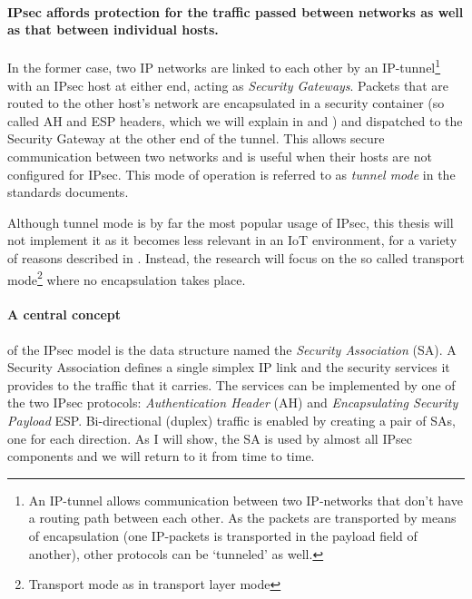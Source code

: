 \documentclass[final,a4paper,twoside,11pt,onecolumn]{report}
\begin{document}
\paragraph{IPsec affords protection for the traffic passed between networks as well as that between individual hosts.} In the former case, two IP networks are linked to each other by an IP-tunnel\footnote{An IP-tunnel allows communication between two IP-networks that don't have a routing path between each other. As the packets are transported by means of encapsulation (one IP-packets is transported in the payload field of another), other protocols can be `tunneled'  as well.} with an IPsec host at either end, acting as \emph{Security Gateways}. Packets that are routed to the other host's network are encapsulated in a security container (so called AH and ESP headers, which we will explain in  and ) and dispatched to the Security Gateway at the other end of the tunnel. This allows secure communication between two networks and is useful when their hosts are not configured for IPsec. This mode of operation is referred to as \emph{tunnel mode} in the standards documents.

Although tunnel mode is by far the most popular usage of IPsec, this thesis will not implement it as it becomes less relevant in an IoT environment, for a variety of reasons described in . Instead, the research will focus on the so called transport mode\footnote{Transport mode as in transport layer mode} where no encapsulation takes place.

\paragraph{A central concept} of the IPsec model is the data structure named the \emph{Security Association} (SA). A Security Association defines a single simplex IP link and the security services it provides to the traffic that it carries. The services can be implemented by one of the two IPsec protocols: \emph{Authentication Header} (AH) and \emph{Encapsulating Security Payload} ESP. Bi-directional (duplex) traffic is enabled by creating a pair of SAs, one for each direction. As I will show, the SA is used by almost all IPsec components and we will return to it from time to time.
\end{document}
